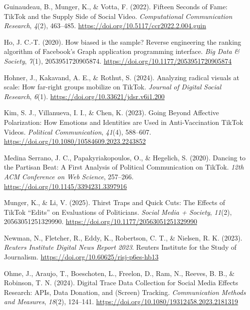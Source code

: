 \documentclass[
  nobib]{ccr}
\newlength{\cslhangindent}
\newenvironment{CSLReferences}[2] %
 {\begin{list}{}{%
  \setlength{\itemindent}{0pt}
  \setlength{\leftmargin}{0pt}
  \setlength{\parsep}{0pt}
  \ifodd #1
   \setlength{\leftmargin}{\cslhangindent}
   \setlength{\itemindent}{-1\cslhangindent}
  \fi
  \setlength{\itemsep}{#2\baselineskip}}}
 {\end{list}}
\begin{document}
\begin{CSLReferences}{1}{0}
Guinaudeau, B., Munger, K., \& Votta, F. (2022). Fifteen {Seconds} of
{Fame}: {TikTok} and the {Supply} {Side} of {Social} {Video}.
\emph{Computational Communication Research}, \emph{4}(2), 463--485.
\url{https://doi.org/10.5117/ccr2022.2.004.guin}

Ho, J. C.-T. (2020). How biased is the sample? {Reverse} engineering the
ranking algorithm of {Facebook}'s {Graph} application programming
interface. \emph{Big Data \& Society}, \emph{7}(1), 2053951720905874.
\url{https://doi.org/10.1177/2053951720905874}

Hohner, J., Kakavand, A. E., \& Rothut, S. (2024). Analyzing radical
visuals at scale: {How} far-right groups mobilize on {TikTok}.
\emph{Journal of Digital Social Research}, \emph{6}(1).
\url{https://doi.org/10.33621/jdsr.v6i1.200}

Kim, S. J., Villanueva, I. I., \& Chen, K. (2023). Going {Beyond}
{Affective} {Polarization}: {How} {Emotions} and {Identities} are {Used}
in {Anti}-{Vaccination} {TikTok} {Videos}. \emph{Political
Communication}, \emph{41}(4), 588--607.
\url{https://doi.org/10.1080/10584609.2023.2243852}

Medina Serrano, J. C., Papakyriakopoulos, O., \& Hegelich, S. (2020).
Dancing to the {Partisan} {Beat}: {A} {First} {Analysis} of {Political}
{Communication} on {TikTok}. \emph{12th {ACM} {Conference} on {Web}
{Science}}, 257--266. \url{https://doi.org/10.1145/3394231.3397916}

Munger, K., \& Li, V. (2025). Thirst {Traps} and {Quick} {Cuts}: {The}
{Effects} of {TikTok} {``{Edits}''} on {Evaluations} of {Politicians}.
\emph{Social Media + Society}, \emph{11}(2), 20563051251329990.
\url{https://doi.org/10.1177/20563051251329990}

Newman, N., Fletcher, R., Eddy, K., Robertson, C. T., \& Nielsen, R. K.
(2023). \emph{Reuters {Institute} {Digital} {News} {Report} 2023}.
Reuters Institute for the Study of Journalism.
\url{https://doi.org/10.60625/risj-p6es-hb13}

Ohme, J., Araujo, T., Boeschoten, L., Freelon, D., Ram, N., Reeves, B.
B., \& Robinson, T. N. (2024). Digital {Trace} {Data} {Collection} for
{Social} {Media} {Effects} {Research}: {APIs}, {Data} {Donation}, and
({Screen}) {Tracking}. \emph{Communication Methods and Measures},
\emph{18}(2), 124--141.
\url{https://doi.org/10.1080/19312458.2023.2181319}


\end{CSLReferences}
\end{document}
